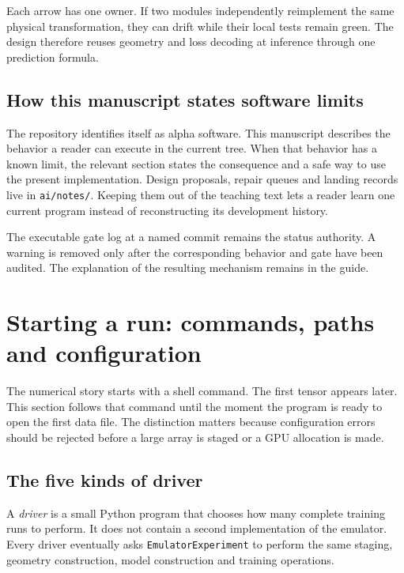 \documentclass[10pt,aps,prd,twocolumn,nofootinbib]{revtex4-2}
\newcommand{\code}[1]{\texttt{#1}}
\begin{document}
Each arrow has one owner.  If two modules independently reimplement the same
physical transformation, they can drift while their local tests remain
green.  The design therefore reuses geometry and loss decoding at inference
through one prediction formula.

\subsection{How this manuscript states software limits}

The repository identifies itself as alpha software.  This manuscript describes
the behavior a reader can execute in the current tree.  When that behavior has
a known limit, the relevant section states the consequence and a safe way to
use the present implementation.  Design proposals, repair queues and landing
records live in \code{ai/notes/}.  Keeping them out of the teaching text lets a
reader learn one current program instead of reconstructing its development
history.

The executable gate log at a named commit remains the status authority.  A
warning is removed only after the corresponding behavior and gate have been
audited.  The explanation of the resulting mechanism remains in the guide.

\section{Starting a run: commands, paths and configuration}
\label{sec:starting}

The numerical story starts with a shell command.  The first tensor appears
later.  This section follows that command until the moment the program is ready to open the
first data file.  The distinction matters because configuration errors should
be rejected before a large array is staged or a GPU allocation is made.

\subsection{The five kinds of driver}

A \emph{driver} is a small Python program that chooses how many complete
training runs to perform.  It does not contain a second implementation of the
emulator.  Every driver eventually asks \code{EmulatorExperiment} to perform
the same staging, geometry construction, model construction and training
operations.
\end{document}
